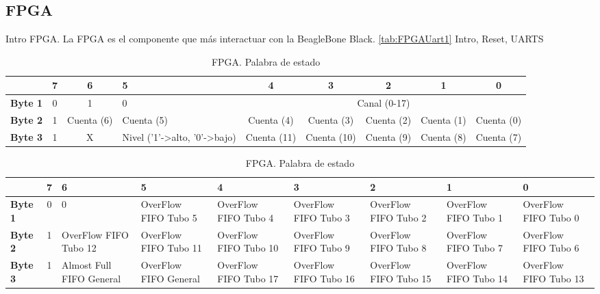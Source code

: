 \subsection{FPGA}
	Intro FPGA. La FPGA es el componente que más interactuar con la BeagleBone Black. \ref{tab:FPGAUart1}
	Intro, Reset, UARTS 
	\begin{table}[h]
		\tiny
		\begin{tabularx}{\textwidth}{|l|c|c|X|c|c|c|c|c|}
			\hline
			\rowcolor[HTML]{C0C0C0} 
			\multicolumn{1}{|r|}{\textbf{Bit}}    	& 7 & 6          & 5 				& 4 	       & 3 	     & 2 	  & 1          & 0 	     \\ \hline
			\cellcolor[HTML]{C0C0C0}\textbf{Byte 1} & 0 & 1          & 0  				& \multicolumn{5}{c|}{Canal (0-17)}				     \\ \hline
			\cellcolor[HTML]{C0C0C0}\textbf{Byte 2} & 1 & Cuenta (6) & Cuenta (5)      		& Cuenta (4)   & Cuenta (3)  & Cuenta (2) & Cuenta (1) & Cuenta (0)  \\ \hline
			\cellcolor[HTML]{C0C0C0}\textbf{Byte 3} & 1 & X          & Nivel ('1'->alto, '0'->bajo) & Cuenta (11)  & Cuenta (10) & Cuenta (9) & Cuenta (8) & Cuenta (7)  \\ \hline
		\end{tabularx}
		\caption{FPGA. Palabra de ancho de pulso}

		\begin{tabularx}{\textwidth}{|l|c|X|X|X|X|X|X|X|}
			\hline
			\rowcolor[HTML]{C0C0C0} 
			\multicolumn{1}{|r|}{\textbf{Bit}} 	& 7 & 6 		       & 5 		       & 4		       & 3 		       & 2		       & 1          	       & 0			\\ \hline
			\cellcolor[HTML]{C0C0C0}\textbf{Byte 1} & 0 & 0                        & OverFlow FIFO Tubo 5  & OverFlow FIFO Tubo 4  & OverFlow FIFO Tubo 3  & OverFlow FIFO Tubo 2  & OverFlow FIFO Tubo 1  & OverFlow FIFO Tubo 0	\\ \hline
			\cellcolor[HTML]{C0C0C0}\textbf{Byte 2} & 1 & OverFlow FIFO Tubo 12    & OverFlow FIFO Tubo 11 & OverFlow FIFO Tubo 10 & OverFlow FIFO Tubo 9  & OverFlow FIFO Tubo 8  & OverFlow FIFO Tubo 7  & OverFlow FIFO Tubo 6	\\ \hline
			\cellcolor[HTML]{C0C0C0}\textbf{Byte 3} & 1 & Almost Full FIFO General & OverFlow FIFO General & OverFlow FIFO Tubo 17 & OverFlow FIFO Tubo 16 & OverFlow FIFO Tubo 15 & OverFlow FIFO Tubo 14 & OverFlow FIFO Tubo 13	\\ \hline
		\end{tabularx}
		\caption{FPGA. Palabra de estado}


\end{table}
